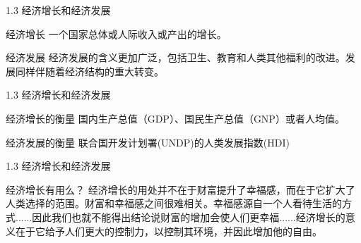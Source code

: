 \documentclass[UTF8,14pt,blue,hyperref={CJKbookmarks=true}]{beamer}
\begin{document}
\begin{frame}{1.3 经济增长和经济发展}
\begin{block}{经济增长}
一个国家总体或人际收入或产出的增长。
\end{block}
\begin{block}{经济发展}
经济发展的含义更加广泛，包括卫生、教育和人类其他福利的改进。发展同样伴随着经济结构的重大转变。
\end{block}
\end{frame}

\begin{frame}{1.3 经济增长和经济发展}
\begin{block}{经济增长的衡量}
国内生产总值（GDP）、国民生产总值（GNP）或者人均值。
\end{block}
\begin{block}{经济发展的衡量}
联合国开发计划署(UNDP)的人类发展指数(HDI)
\end{block}
\end{frame}

\begin{frame}{1.3 经济增长和经济发展}
\begin{block}{经济增长有用么？}
经济增长的用处并不在于财富提升了幸福感，而在于它扩大了人类选择的范围。财富和幸福感之间很难相关。幸福感源自一个人看待生活的方式......因此我们也就不能得出结论说财富的增加会使人们更幸福......经济增长的意义在于它给予人们更大的控制力，以控制其环境，并因此增加他的自由。
\end{block}
\end{frame}
\end{document}
